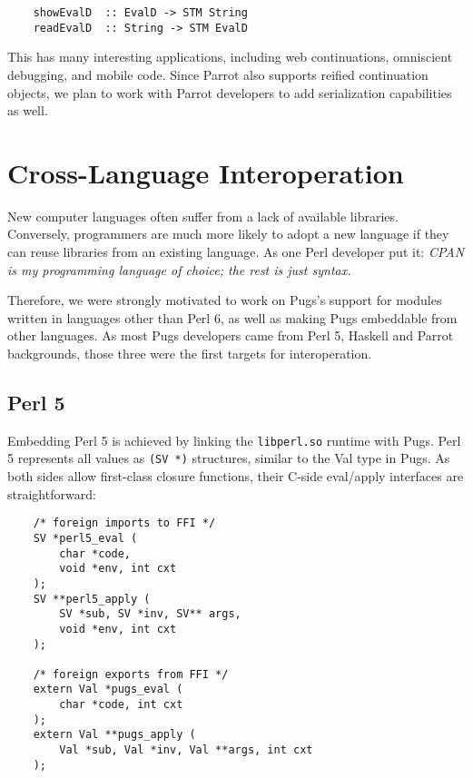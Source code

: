\documentclass[]{sigplanconf}
\newcommand{\code}[1]{\texttt{#1}}
\begin{document}
\begin{lstlisting}
    showEvalD  :: EvalD -> STM String
    readEvalD  :: String -> STM EvalD
\end{lstlisting}

This has many interesting applications, including web continuations, omniscient
debugging, and mobile code.  Since Parrot also supports reified continuation
objects, we plan to work with Parrot developers to add serialization
capabilities as well.

\section{Cross-Language Interoperation}
\label{sec:Cross-LanguageInteroperation}

New computer languages often suffer from a lack of available libraries.
Conversely, programmers are much more likely to adopt a new language if they
can reuse libraries from an existing language.  As one Perl developer put it:
\emph{CPAN is my programming language of choice; the rest is just syntax.}

Therefore, we were strongly motivated to work on Pugs's support for modules
written in languages other than Perl 6, as well as making Pugs embeddable from
other languages.  As most Pugs developers came from Perl 5, Haskell and Parrot
backgrounds, those three were the first targets for interoperation.

\subsection{Perl 5}
\label{sec:Perl5}

Embedding Perl 5 is achieved by linking the \code{libperl.so} runtime with
Pugs.  Perl 5 represents all values as \code{(SV *)} structures, similar to the
Val type in Pugs.  As both sides allow first-class closure functions, their
C-side eval/apply interfaces are straightforward:

\begin{lstlisting}
    /* foreign imports to FFI */
    SV *perl5_eval (
        char *code,
        void *env, int cxt
    );
    SV **perl5_apply (
        SV *sub, SV *inv, SV** args,
        void *env, int cxt
    );

    /* foreign exports from FFI */
    extern Val *pugs_eval (
        char *code, int cxt
    );
    extern Val **pugs_apply (
        Val *sub, Val *inv, Val **args, int cxt
    );
\end{lstlisting}
\end{document}
